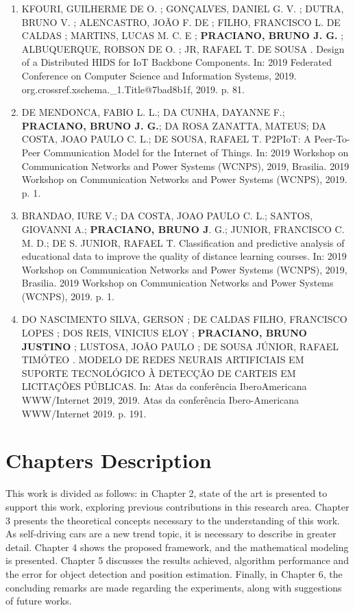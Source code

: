 \begin{enumerate}
\item KFOURI, GUILHERME DE O. ; GONÇALVES, DANIEL G. V. ; DUTRA, BRUNO V. ; ALENCASTRO, JOÃO F. DE ; FILHO, FRANCISCO L. DE CALDAS ; MARTINS, LUCAS M. C. E ; \textbf{PRACIANO, BRUNO J. G.} ; ALBUQUERQUE, ROBSON DE O. ; JR, RAFAEL T. DE SOUSA . Design of a Distributed HIDS for IoT Backbone Components. In: 2019 Federated Conference on Computer Science and Information Systems, 2019. org.crossref.xschema.\_1.Title@7bad8b1f, 2019. p. 81.

\item DE MENDONCA, FABIO L. L.; DA CUNHA, DAYANNE F.; \textbf{PRACIANO, BRUNO J. G.}; DA ROSA ZANATTA, MATEUS; DA COSTA, JOAO PAULO C. L.; DE SOUSA, RAFAEL T. P2PIoT: A Peer-To-Peer Communication Model for the Internet of Things. In: 2019 Workshop on Communication Networks and Power Systems (WCNPS), 2019, Brasilia. 2019 Workshop on Communication Networks and Power Systems (WCNPS), 2019. p. 1.

\item BRANDAO, IURE V.; DA COSTA, JOAO PAULO C. L.; SANTOS, GIOVANNI A.; \textbf{PRACIANO, BRUNO J}. G.; JUNIOR, FRANCISCO C. M. D.; DE S. JUNIOR, RAFAEL T. Classification and predictive analysis of educational data to improve the quality of distance learning courses. In: 2019 Workshop on Communication Networks and Power Systems (WCNPS), 2019, Brasilia. 2019 Workshop on Communication Networks and Power Systems (WCNPS), 2019. p. 1.


\item DO NASCIMENTO SILVA, GERSON ; DE CALDAS FILHO, FRANCISCO LOPES ; DOS REIS, VINICIUS ELOY ; \textbf{PRACIANO, BRUNO JUSTINO }; LUSTOSA, JOÃO PAULO ; DE SOUSA JÚNIOR, RAFAEL TIMÓTEO . MODELO DE REDES NEURAIS ARTIFICIAIS EM SUPORTE TECNOLÓGICO À DETECÇÃO DE CARTEIS EM LICITAÇÕES PÚBLICAS. In: Atas da conferência IberoAmericana WWW/Internet 2019, 2019. Atas da conferência Ibero-Americana WWW/Internet 2019. p. 191.

\end{enumerate}

\section{Chapters Description}

This work is divided as follows: in Chapter 2, state of the art is presented to support this work, exploring previous contributions in this research area. Chapter 3 presents the theoretical concepts necessary to the understanding of this work. As self-driving cars are a new trend topic, it is necessary to describe in greater detail. Chapter 4 shows the proposed framework, and the mathematical modeling is presented. Chapter 5 discusses the results achieved, algorithm performance and the error for object detection and position estimation. Finally, in Chapter 6, the concluding remarks are made regarding the experiments, along with suggestions of future works.


